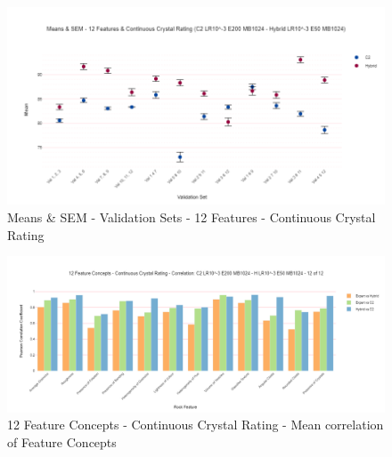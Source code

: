 \begin{figure}[H]
  \centering
    \includegraphics[width=\textwidth]{images/Means & SEM - 12 Features & Continuous Crystal Rating (C2 LR10^-3 E200 MB1024 - Hybrid LR10^-3 E50 MB1024).png}
    \caption{Means \& SEM - Validation Sets - 12 Features - Continuous Crystal Rating} \label{fig:Means & SEM - Validation Sets - 12 Features - Continuous Crystal Rating}
\end{figure}

\begin{figure}[H]
  \centering
    \includegraphics[width=\textwidth]{images/12 Feature Concepts - Continuous Crystal Rating - Correlation- C2 LR10^-3 E200 MB1024 - H LR10^-3 E50 MB1024 - 12 of 12.png}
    \caption{12 Feature Concepts - Continuous Crystal Rating - Mean correlation of Feature Concepts} \label{fig:12 Feature Concepts - Continuous Crystal Rating - Mean correlation of Feature Concepts}
\end{figure}


